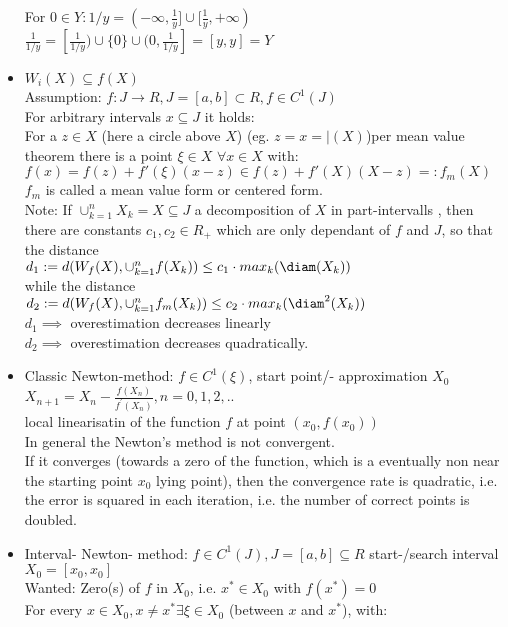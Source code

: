 \begin{itemize}
For $0\in Y: 1/y=(-\infty,\frac{1}{y}]\cup [\frac{1}{y},+\infty)$\\
$\frac{1}{1/y}=[\frac{1}{1/y})\cup \{0\}\cup (0,\frac{1}{1/y}]=[y,y]=Y$\\
\item $W_i(X)\subseteq f(X)$ \\
Assumption: $f:J\to R, J=[a,b]\subset R, f\in C^1(J)$ \\
For arbitrary intervals $x\subseteq J$ it holds: \\
For a $z\in X$ (here a circle above $X$) (eg. $z=x=\mid(X)$)per mean value theorem there is a point $\xi\in X$ $\forall x\in X$ with: \\
$f(x)=f(z)+f'(\xi)(x-z) \in f(z)+f'(X)(X-z)=:f_m(X)$ \\
$f_m$ is called a mean value form or centered form. \\
Note: If $\cup_{k=1}^n X_k=X\subseteq J$ a decomposition of $X$ in part-intervalls , then there are constants $c_1,c_2 \in R_+$ which are only dependant of $f$ and $J$, so that the distance \\
$d_1:=d(W_f(X), \cup_{k=1}^n f(X_k))\le c_1\cdot max_k (\diam(X_k))$ \\
while the distance \\
$d_2:=d(W_f(X),\cup_{k=1}^nf_m(X_k))\le c_2\cdot max_k(\diam^2(X_k))$ \\
$d_1\implies $ overestimation decreases linearly \\
$d_2\implies$ overestimation decreases quadratically.
\item Classic Newton-method:
$f\in C^1(\xi)$, start point/- approximation $X_0$ \\
$X_{n+1}=X_n-\frac{f(X_n)}{f^\prime(X_n)}, n=0,1,2,..$ \\
local linearisatin of the function $f$ at point $(x_0,f(x_0))$ \\
In general the Newton's method is not convergent. \\
If it converges (towards a zero of the function, which is a eventually non near the starting point $x_0$ lying point), then the convergence rate is quadratic, i.e. the error is squared in each iteration, i.e. the number of correct points is doubled.
\item Interval- Newton- method:
$f\in C^1(J), J=[a,b]\subseteq R$ start-/search interval $X_0=[x_0,x_0]$ \\
Wanted: Zero(s) of $f$ in $X_0$, i.e. $x^*\in X_0$ with $f(x^*)=0$ \\
For every $x\in X_0, x\not = x^* \exists \xi \in X_0$ (between $x$ and $x^*$), with: \\

\end{itemize}
